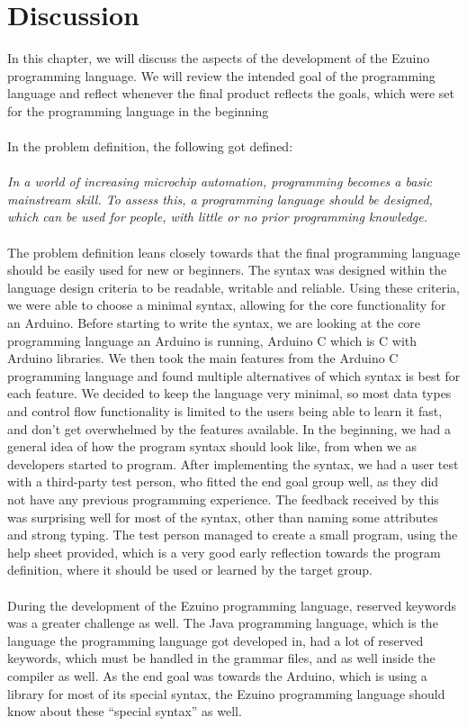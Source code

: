 \chapter{Discussion}
In this chapter, we will discuss the aspects of the development of the Ezuino programming language. We will review the intended goal of the programming language and reflect whenever the final product reflects the goals, which were set for the programming language in the beginning
\\\\
In the problem definition, the following got defined:
\\\\
\textit{In a world of increasing microchip automation, programming becomes a basic mainstream skill. To assess this, a programming language should be designed, which can be used for people, with little or no prior programming knowledge. }
\\\\
The problem definition leans closely towards that the final programming language should be easily used for new or beginners. The syntax was designed within the language design criteria to be readable, writable and reliable. Using these criteria, we were able to choose a minimal syntax, allowing for the core functionality for an Arduino. Before starting to write the syntax, we are looking at the core programming language an Arduino is running, Arduino C which is C with Arduino libraries. We then took the main features from the Arduino C programming language and found multiple alternatives of which syntax is best for each feature. We decided to keep the language very minimal, so most data types and control flow functionality is limited to the users being able to learn it fast, and don’t get overwhelmed by the features available. In the beginning, we had a general idea of how the program syntax should look like, from when we as developers started to program. After implementing the syntax, we had a user test with a third-party test person, who fitted the end goal group well, as they did not have any previous programming experience. The feedback received by this was surprising well for most of the syntax, other than naming some attributes and strong typing. The test person managed to create a small program, using the help sheet provided, which is a very good early reflection towards the program definition, where it should be used or learned by the target group.
\\\\
During the development of the Ezuino programming language, reserved keywords was a greater challenge as well. The Java programming language, which is the language the programming language got developed in, had a lot of reserved keywords, which must be handled in the grammar files, and as well inside the compiler as well. As the end goal was towards the Arduino, which is using a library for most of its special syntax, the Ezuino programming language should know about these “special syntax” as well.
